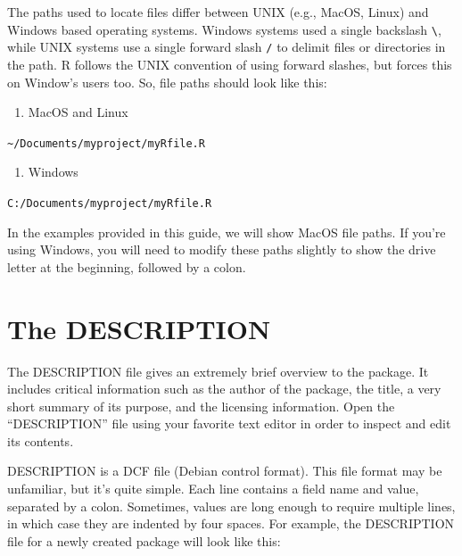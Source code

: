 \documentclass[
]{book}
\providecommand{\tightlist}{%
  \setlength{\itemsep}{0pt}\setlength{\parskip}{0pt}}
\begin{document}
The paths used to locate files differ between UNIX (e.g., MacOS, Linux) and Windows based operating systems. Windows systems used a single backslash \texttt{\textbackslash{}}, while UNIX systems use a single forward slash \texttt{/} to delimit files or directories in the path. R follows the UNIX convention of using forward slashes, but forces this on Window's users too. So, file paths should look like this:

\begin{enumerate}
\def\labelenumi{\arabic{enumi}.}
\tightlist
\item
  MacOS and Linux
\end{enumerate}

\texttt{\textasciitilde{}/Documents/myproject/myRfile.R}

\begin{enumerate}
\def\labelenumi{\arabic{enumi}.}
\setcounter{enumi}{1}
\tightlist
\item
  Windows
\end{enumerate}

\texttt{C:/Documents/myproject/myRfile.R}

In the examples provided in this guide, we will show MacOS file paths. If you're using Windows, you will need to modify these paths slightly to show the drive letter at the beginning, followed by a colon.

\hypertarget{the-description}{%
\section{The DESCRIPTION}\label{the-description}}

The DESCRIPTION file gives an extremely brief overview to the package. It includes critical information such as the author of the package, the title, a very short summary of its purpose, and the licensing information. Open the ``DESCRIPTION'' file using your favorite text editor in order to inspect and edit its contents.

DESCRIPTION is a DCF file (Debian control format). This file format may be unfamiliar, but it's quite simple. Each line contains a field name and value, separated by a colon. Sometimes, values are long enough to require multiple lines, in which case they are indented by four spaces. For example, the DESCRIPTION file for a newly created package will look like this:
\end{document}

